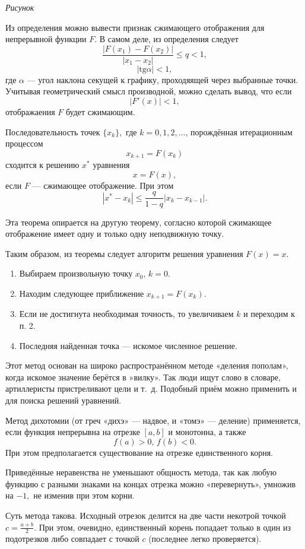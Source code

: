 \emph{Рисунок}

Из определения можно вывести признак сжимающего отображения для
непрерывной функции $F$. В самом деле, из определения следует
\[
\frac{|F(x_{1})-F(x_{2})|}{|x_{1}-x_{2}|}\leqslant q<1,
\]
\[
|\mathrm{tg}\alpha|<1,
\]
где $\alpha$ — угол наклона секущей к графику, проходяящей через
выбранные точки. Учитывая геометрический смысл производной, можно
сделать вывод, что если
\[
|F'(x)|<1,
\]
отображаения $F$ будет сжимающим.
\begin{thm}
Последовательность точек $\{x_{k}\},$ где $k=0,1,2,\dots$, порождённая
итерационным процессом 
\[
x_{k+1}=F(x_{k})
\]
 сходится к решению $x^{*}$ уравнения 
\[
x=F(x),
\]
если $F$ — сжимающее отображение. При этом
\[
|x^{*}-x_{k}|\leqslant\frac{q}{1-q}|x_{k}-x_{k-1}|.
\]

\end{thm}
Эта теорема опирается на другую теорему, согласно которой сжимающее
отображение имеет одну и только одну неподвижную точку.

Таким образом, из теоремы следует алгоритм решения уравнения $F(x)=x$.
\begin{enumerate}
\item Выбираем произвольную точку $x_{0},\, k=0$.
\item Находим следующее приближение $x_{k+1}=F(x_{k})$.
\item Если не достигнута необходимая точность, то увеличиваем $k$ и
  переходим к п. 2.
\item Последняя найденная точка — искомое численное решение.
\end{enumerate}


Этот метод основан на широко распространённом методе «деления
  пополам», когда искомое значение берётся в »вилку». Так люди ищут
    слово в словаре, артиллеристы пристреливают цели и т.~д. Подобный
    приём можно применить и для поиска решений уравнений.

Метод дихотомии (от греч «дихэ» — надвое, и «томэ» — деление)
применяется, если функция непрерывна на отрезке $[a,b]$ и монотонна, а
также
\[
f(a)>0,\, f(b)<0.
\]
При этом предполагается существование на отрезке единственного корня.

Приведённые неравенства не уменьшают общность метода, так как любую
функцию с разными знаками на концах отрезка можно «перевернуть»,
умножив на $-1,$ не изменив при этом корни.

Суть метода такова. Исходный отрезок делится на две части некотрой
точкой $c=\frac{a+b}{2}$. При этом, очевидно, единственный корень
попадает только в один из подотрезков либо совпадает с точкой $c$
(последнее легко проверяется).

